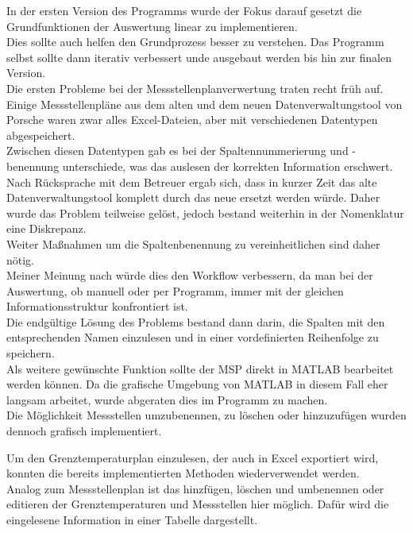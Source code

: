 In der ersten Version des Programms wurde der Fokus darauf gesetzt die Grundfunktionen der Auswertung linear zu implementieren. \\
Dies sollte auch helfen den Grundprozess besser zu verstehen. Das Programm selbst sollte dann iterativ verbessert unde ausgebaut werden bis hin zur finalen Version.\\

Die ersten Probleme bei der Messstellenplanverwertung traten recht früh auf. Einige Messstellenpläne aus dem alten und dem neuen Datenverwaltungstool von Porsche waren zwar alles Excel-Dateien, aber mit verschiedenen Datentypen abgespeichert. \\
Zwischen diesen Datentypen gab es bei der Spaltennummerierung und -benennung unterschiede, was das auslesen der korrekten Information erschwert.\\
Nach Rücksprache mit dem Betreuer ergab sich, dass in kurzer Zeit das alte Datenverwaltungstool komplett durch das neue ersetzt werden würde. Daher wurde das Problem teilweise gelöst, jedoch bestand weiterhin in der Nomenklatur eine Diskrepanz. \\
Weiter Maßnahmen um die Spaltenbenennung zu vereinheitlichen sind daher nötig.\\
Meiner Meinung nach würde dies den Workflow verbessern, da man bei der Auswertung, ob manuell oder per Programm, immer mit der gleichen Informationsstruktur konfrontiert ist. \\
Die endgültige Lösung des Problems bestand dann darin, die Spalten mit den entsprechenden Namen einzulesen und in einer vordefinierten Reihenfolge zu speichern.\\
Als weitere gewünschte Funktion sollte der MSP direkt in MATLAB bearbeitet werden können. Da die grafische Umgebung von MATLAB in diesem Fall eher langsam arbeitet, wurde abgeraten dies im Programm zu machen. \\
Die Möglichkeit Messstellen umzubenennen, zu löschen oder hinzuzufügen wurden dennoch grafisch implementiert. 

Um den Grenztemperaturplan einzulesen, der auch in Excel exportiert wird, konnten die bereits implementierten Methoden wiederverwendet werden. \\
Analog zum Messstellenplan ist das hinzfügen, löschen und umbenennen oder editieren der Grenztemperaturen und Messstellen hier möglich. Dafür wird die eingelesene Information in einer Tabelle dargestellt. \\

